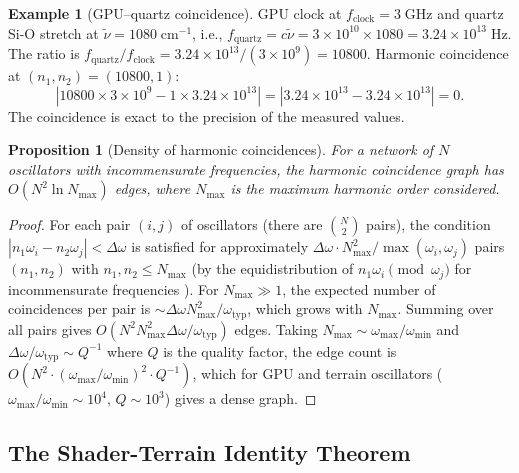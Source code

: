 \documentclass[10pt,twocolumn]{article}
\newtheorem{proposition}[theorem]{Proposition}
\theoremstyle{definition}
\newtheorem{example}[theorem]{Example}
\theoremstyle{remark}
\begin{document}
\begin{example}[GPU--quartz coincidence]
GPU clock at $f_{\mathrm{clock}}=3\;\mathrm{GHz}$ and quartz
Si-O stretch at $\tilde{\nu}=1080\;\mathrm{cm^{-1}}$, i.e.,
$f_{\mathrm{quartz}}=c\tilde{\nu}=3\times 10^{10}\times
1080 = 3.24\times 10^{13}\;\mathrm{Hz}$.  The ratio is
$f_{\mathrm{quartz}}/f_{\mathrm{clock}}=3.24\times
10^{13}/(3\times 10^9) = 10800$.  Harmonic coincidence at
$(n_1,n_2)=(10800,1)$:
\begin{equation}
  |10800\times 3\times 10^9 - 1\times 3.24\times 10^{13}|
  = |3.24\times 10^{13} - 3.24\times 10^{13}| = 0.
\end{equation}
The coincidence is exact to the precision of the measured
values.
\end{example}

\begin{proposition}[Density of harmonic coincidences]
\label{prop:dense}
For a network of $N$ oscillators with incommensurate
frequencies, the harmonic coincidence graph has
$O(N^2\ln N_{\max})$ edges, where $N_{\max}$ is the maximum
harmonic order considered.
\end{proposition}

\begin{proof}
For each pair $(i,j)$ of oscillators (there are $\binom{N}{2}$
pairs), the condition $|n_1\omega_i - n_2\omega_j|<
\Delta\omega$ is satisfied for approximately
$\Delta\omega\cdot N_{\max}^2/\max(\omega_i,\omega_j)$
pairs $(n_1,n_2)$ with $n_1,n_2\le N_{\max}$ (by the
equidistribution of $n_1\omega_i\pmod{\omega_j}$ for
incommensurate frequencies \citep{Feller1968}).  For
$N_{\max}\gg 1$, the expected number of coincidences per pair
is $\sim\Delta\omega N_{\max}^2/\omega_{\mathrm{typ}}$, which
grows with $N_{\max}$.  Summing over all pairs gives
$O(N^2 N_{\max}^2 \Delta\omega/\omega_{\mathrm{typ}})$ edges.
Taking $N_{\max}\sim\omega_{\mathrm{max}}/\omega_{\mathrm{min}}$
and $\Delta\omega/\omega_{\mathrm{typ}}\sim Q^{-1}$ where $Q$
is the quality factor, the edge count is
$O(N^2\cdot(\omega_{\mathrm{max}}/\omega_{\mathrm{min}})^2
\cdot Q^{-1})$, which for GPU and terrain oscillators
($\omega_{\mathrm{max}}/\omega_{\mathrm{min}}\sim 10^4$,
$Q\sim 10^3$) gives a dense graph.
\end{proof}

\subsection{The Shader-Terrain Identity Theorem}
\label{sec:shader_identity}
\end{document}
